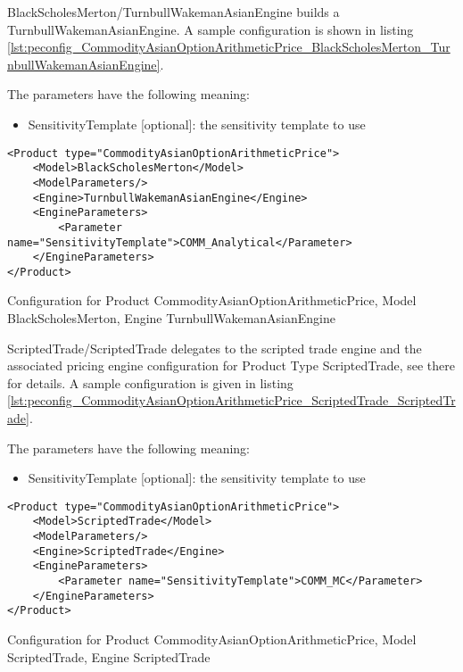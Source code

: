 BlackScholesMerton/TurnbullWakemanAsianEngine builds a TurnbullWakemanAsianEngine. A sample configuration is shown in
listing \ref{lst:peconfig_CommodityAsianOptionArithmeticPrice_BlackScholesMerton_TurnbullWakemanAsianEngine}.

The parameters have the following meaning:

\begin{itemize}
\item SensitivityTemplate [optional]: the sensitivity template to use 
\end{itemize}

\begin{longlisting}
\begin{verbatim}
<Product type="CommodityAsianOptionArithmeticPrice">
    <Model>BlackScholesMerton</Model>
    <ModelParameters/>
    <Engine>TurnbullWakemanAsianEngine</Engine>
    <EngineParameters>
        <Parameter name="SensitivityTemplate">COMM_Analytical</Parameter>
    </EngineParameters>
</Product>
\end{verbatim}
\caption{Configuration for Product CommodityAsianOptionArithmeticPrice, Model BlackScholesMerton, Engine TurnbullWakemanAsianEngine}
\label{lst:peconfig_CommodityAsianOptionArithmeticPrice_BlackScholesMerton_TurnbullWakemanAsianEngine}
\end{longlisting}

ScriptedTrade/ScriptedTrade delegates to the scripted trade engine and the associated pricing engine configuration for
Product Type ScriptedTrade, see there for details. A sample configuration is given in listing
\ref{lst:peconfig_CommodityAsianOptionArithmeticPrice_ScriptedTrade_ScriptedTrade}.

The parameters have the following meaning:

\begin{itemize}
\item SensitivityTemplate [optional]: the sensitivity template to use 
\end{itemize}

\begin{longlisting}
\begin{verbatim}
<Product type="CommodityAsianOptionArithmeticPrice">
    <Model>ScriptedTrade</Model>
    <ModelParameters/>
    <Engine>ScriptedTrade</Engine>
    <EngineParameters>
        <Parameter name="SensitivityTemplate">COMM_MC</Parameter>
    </EngineParameters>
</Product>
\end{verbatim}
\caption{Configuration for Product CommodityAsianOptionArithmeticPrice, Model ScriptedTrade, Engine ScriptedTrade}
\label{lst:peconfig_CommodityAsianOptionArithmeticPrice_ScriptedTrade_ScriptedTrade}
\end{longlisting}


